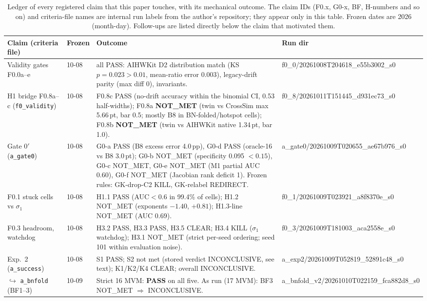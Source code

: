 \documentclass[journal]{IEEEtran}
\newcommand{\bviii}{\textsc{B8}}
\newcommand{\pt}{\,pt}
\begin{document}
\begin{table}[t]
\caption{Ledger of every registered claim that this paper touches, with its mechanical outcome. The claim IDs (F0.x, G0-x, BF, H-numbers and so on) and criteria-file names are internal run labels from the author's repository; they appear only in this table. Frozen dates are 2026 (month-day). Follow-ups are listed directly below the claim that motivated them.}
\label{tab:ledger}
\centering\footnotesize
\begin{tabular}{p{2.6cm}p{1.5cm}p{9.2cm}p{2.9cm}}
\toprule
Claim (criteria file) & Frozen & Outcome & Run dir \\
\midrule
Validity gates F0.0a--e & 10-08 & all PASS: AIHWKit D2 distribution match (KS $p=0.023>0.01$, mean-ratio error 0.003), legacy-drift parity (max diff 0), invariants. & f0\_0/\allowbreak 20261008T204618\_e55b3002\_s0 \\
H1 bridge F0.8a--c (\texttt{f0\_validity}) & 10-08 & F0.8c PASS (no-drift accuracy within the binomial CI, 0.53 half-widths); F0.8a \textbf{NOT\_MET} (twin vs CrossSim max 5.66\pt, bar 0.5; mostly \bviii{} in BN-folded/hotspot cells); F0.8b \textbf{NOT\_MET} (twin vs AIHWKit native 1.34\pt, bar 1.0). & f0\_8/\allowbreak 20261011T151445\_d931ec73\_s0 \\
Gate 0$'$ (\texttt{a\_gate0}) & 10-08 & G0-a PASS (B8 excess error 4.0\,pp), G0-d PASS (oracle-16 vs B8 3.0\pt{}); G0-b NOT\_MET (specificity 0.095 $<0.15$), G0-c NOT\_MET, G0-e NOT\_MET (M1 partial AUC 0.60), G0-f NOT\_MET (Jacobian rank deficit 1). Frozen rules: GK-drop-C2 KILL, GK-relabel REDIRECT. & a\_gate0/\allowbreak 20261009T020655\_ae67b976\_s0 \\
F0.1 stuck cells vs $\sigma_1$ & 10-08 & H1.1 PASS (AUC$<$0.6 in 99.4\% of cells); H1.2 NOT\_MET (exponents $-1.40$, $+0.81$); H1.3-line NOT\_MET (AUC 0.69). & f0\_1/\allowbreak 20261009T023921\_a8f8370e\_s0 \\
F0.3 headroom, watchdog & 10-08 & H3.2 PASS, H3.3 PASS, H3.5 CLEAR; H3.4 KILL ($\sigma_1$ watchdog); H3.1 NOT\_MET (strict per-seed ordering; seed 101 within evaluation noise). & f0\_3/\allowbreak 20261009T181003\_aca2558e\_s0 \\
Exp.~2 (\texttt{a\_success}) & 10-08 & S1 PASS; S2 not met (stored verdict INCONCLUSIVE, see text); K1/K2/K4 CLEAR; overall INCONCLUSIVE. & a\_exp2/\allowbreak 20261009T052819\_52891c48\_s0 \\
\quad $\hookrightarrow$ \texttt{a\_bnfold} (BF1--3) & 10-09 & Strict 16 MVM: \textbf{PASS} on all five. As run (17 MVM): BF3 NOT\_MET $\Rightarrow$ INCONCLUSIVE. & a\_bnfold\_v2/\allowbreak 20261010T022159\_fca882d8\_s0 \\

\end{tabular}
\end{table}
\end{document}

